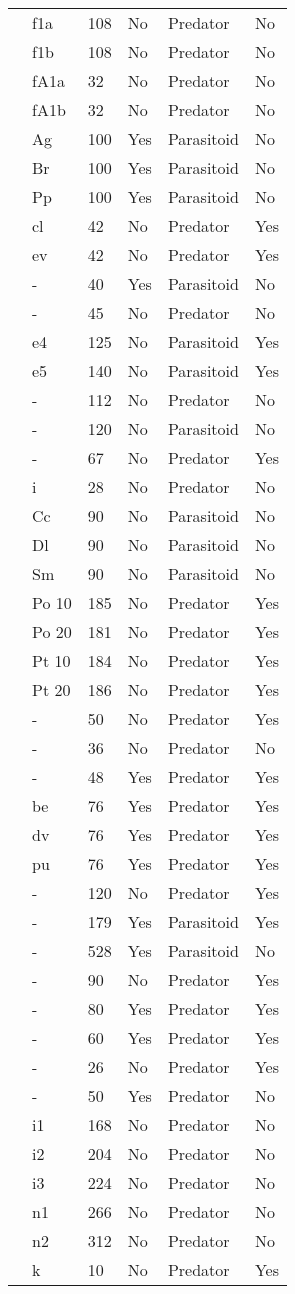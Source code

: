 \begin{longtable}{llllll}
\citet{Griffen:2007aa}&f1a&108&No&Predator&No\tabularnewline
\citet{Griffen:2007aa}&f1b&108&No&Predator&No\tabularnewline
\citet{Griffen:2007aa}&fA1a&32&No&Predator&No\tabularnewline
\citet{Griffen:2007aa}&fA1b&32&No&Predator&No\tabularnewline
\citet{Hassan:1976aa}&Ag&100&Yes&Parasitoid&No\tabularnewline
\citet{Hassan:1976aa}&Br&100&Yes&Parasitoid&No\tabularnewline
\citet{Hassan:1976aa}&Pp&100&Yes&Parasitoid&No\tabularnewline
\citet{Hossie:2016aa}&cl&42&No&Predator&Yes\tabularnewline
\citet{Hossie:2016aa}&ev&42&No&Predator&Yes\tabularnewline
\citet{Huffaker:1982aa}&-&40&Yes&Parasitoid&No\tabularnewline
\citet{Johnson:2006aa}&-&45&No&Predator&No\tabularnewline
\citet{Jones:1988aa}&e4&125&No&Parasitoid&Yes\tabularnewline
\citet{Jones:1988aa}&e5&140&No&Parasitoid&Yes\tabularnewline
\citet{Katz:1985ai}&-&112&No&Predator&No\tabularnewline
\citet{Kfir:1983aa}&-&120&No&Parasitoid&No\tabularnewline
\citet{Kratina:2009aa}&-&67&No&Predator&Yes\tabularnewline
\citet{Krylov:1992aa}&i&28&No&Predator&No\tabularnewline
\citet{Kumar:1985aa}&Cc&90&No&Parasitoid&No\tabularnewline
\citet{Kumar:1985aa}&Dl&90&No&Parasitoid&No\tabularnewline
\citet{Kumar:1985aa}&Sm&90&No&Parasitoid&No\tabularnewline
\citet{Lang:2012aa}&Po 10&185&No&Predator&Yes\tabularnewline
\citet{Lang:2012aa}&Po 20&181&No&Predator&Yes\tabularnewline
\citet{Lang:2012aa}&Pt 10&184&No&Predator&Yes\tabularnewline
\citet{Lang:2012aa}&Pt 20&186&No&Predator&Yes\tabularnewline
\citet{Long:2012aa}&-&50&No&Predator&Yes\tabularnewline
\citet{Mansour:1991aa}&-&36&No&Predator&No\tabularnewline
\citet{Medoc:2013aa}&-&48&Yes&Predator&Yes\tabularnewline
\citet{Medoc:2015aa}&be&76&Yes&Predator&Yes\tabularnewline
\citet{Medoc:2015aa}&dv&76&Yes&Predator&Yes\tabularnewline
\citet{Medoc:2015aa}&pu&76&Yes&Predator&Yes\tabularnewline
\citet{Mertz:1968aa}&-&120&No&Predator&Yes\tabularnewline
\citet{Mills:2004aa}&-&179&Yes&Parasitoid&Yes\tabularnewline
\citet{Montoya:2000aa}&-&528&Yes&Parasitoid&No\tabularnewline
\citet{Omkar:2004aa}&-&90&No&Predator&Yes\tabularnewline
\citet{Prokopenko:2017aa}&-&80&Yes&Predator&Yes\tabularnewline
\citet{Pusack:2018aa}&-&60&Yes&Predator&Yes\tabularnewline
\citet{Reeve:1997aa}&-&26&No&Predator&Yes\tabularnewline
\citet{Salt:1974aa}&-&50&Yes&Predator&No\tabularnewline
\citet{Uttley:1980aa}&i1&168&No&Predator&No\tabularnewline
\citet{Uttley:1980aa}&i2&204&No&Predator&No\tabularnewline
\citet{Uttley:1980aa}&i3&224&No&Predator&No\tabularnewline
\citet{Uttley:1980aa}&n1&266&No&Predator&No\tabularnewline
\citet{Uttley:1980aa}&n2&312&No&Predator&No\tabularnewline
\citet{Vahl:2005aa}&k&10&No&Predator&Yes\tabularnewline

\end{longtable}

